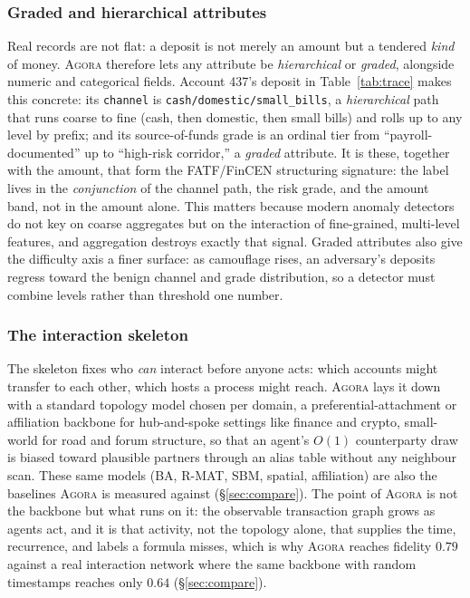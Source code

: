 \documentclass[sigconf,review,anonymous]{acmart}
\newcommand{\sys}{\textsc{Agora}\xspace}
\begin{document}
\subsubsection{Graded and hierarchical attributes}
\label{sec:attrs}
Real records are not flat: a deposit is not merely an amount but a tendered
\emph{kind} of money. \sys{} therefore lets any attribute be \emph{hierarchical} or
\emph{graded}, alongside numeric and categorical fields. Account 437's deposit in
Table~\ref{tab:trace} makes this concrete: its \texttt{channel} is
\texttt{cash/domestic/small\_bills}, a \emph{hierarchical} path that runs coarse to fine
(cash, then domestic, then small bills) and rolls up to any level by prefix; and its
source-of-funds grade is an ordinal tier from ``payroll-documented'' up to ``high-risk
corridor,'' a \emph{graded} attribute. It is these, together with the amount, that form
the FATF/FinCEN structuring signature: the label lives in the \emph{conjunction} of the
channel path, the risk grade, and the amount band, not in the amount alone. This
matters because modern anomaly detectors do not key on coarse aggregates but on the
interaction of fine-grained, multi-level features, and aggregation destroys exactly that
signal. Graded attributes also give the difficulty axis a finer surface: as camouflage
rises, an adversary's deposits regress toward the benign channel and grade distribution,
so a detector must combine levels rather than threshold one number.

\subsubsection{The interaction skeleton}
\label{sec:substrate}
The skeleton fixes who \emph{can} interact before anyone acts: which accounts might
transfer to each other, which hosts a process might reach. \sys{} lays it down with a
standard topology model chosen per domain, a preferential-attachment or
affiliation backbone for hub-and-spoke settings like finance and crypto, small-world for
road and forum structure, so that an agent's $O(1)$ counterparty draw is biased toward
plausible partners through an alias table without any neighbour scan. These same models
(BA, R-MAT, SBM, spatial, affiliation) are also the baselines \sys{} is measured against
(\S\ref{sec:compare}). The point of \sys{} is not the backbone but what runs on it: the
observable transaction graph grows as agents act, and it is that activity, not the
topology alone, that supplies the time, recurrence, and labels a formula misses, which is
why \sys{} reaches fidelity $0.79$ against a real interaction network where the same
backbone with random timestamps reaches only $0.64$ (\S\ref{sec:compare}).
\end{document}
